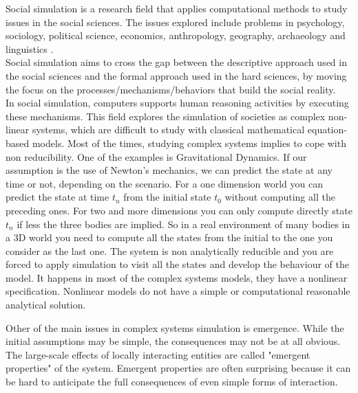 \documentclass[11pt,oneside,a4paper,openright]{report}
\begin{document}

Social simulation is a research field that applies computational methods to study issues in the social sciences. The issues explored include problems in psychology, sociology, political science, economics, anthropology, geography, archaeology and linguistics \cite{TakahashiSallachRouchier2007}.\\
Social simulation aims to cross the gap between the descriptive approach used in the social sciences and the formal approach used in the hard sciences, by moving the focus on the processes/mechanisms/behaviors that build the social reality.\\
In social simulation, computers supports human reasoning activities by executing these mechanisms. This field explores the simulation of societies as complex non-linear systems, which are difficult to study with classical mathematical equation-based models.
Most of the times, studying complex systems implies to cope with non reducibility. One of the examples is Gravitational Dynamics. If our assumption is the use of Newton's mechanics, we can predict the state at any time or not, depending on the scenario. For a one dimension world you can predict the state at time $t_n$ from the initial state $t_0$ without computing all the preceding ones. For two and more dimensions you can only compute directly state $t_n$ if less the three bodies are implied. So in a real environment of many bodies in a 3D world you need to compute all the states from the initial to the one you consider as the last one. The system is non analytically reducible and you are forced to apply simulation to visit all the states and develop the behaviour of the model. It happens in most of the complex systems models, they have a nonlinear specification. Nonlinear models do not have a simple or computational reasonable analytical solution. 

Other of the main issues in complex systems simulation is emergence. While the initial assumptions may be simple, the consequences may not be at all obvious. The large-scale effects of locally interacting entities are called "emergent properties" of the system. Emergent properties are often surprising because it can be hard to anticipate the full consequences of even simple forms of interaction. 
\end{document}
